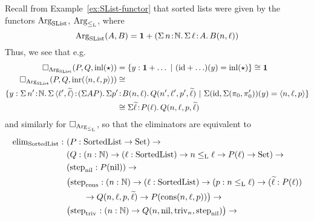 \documentclass[orivec,envcountsame, ,envcountsect]{llncs}
\begin{document}
 \begin{example}
   Recall from Example~\ref{ex:SList-functor} that sorted lists were given by the functors $\text{Arg}_{\text{SList}}$, $\text{Arg}_{\leq_{\text{L}}}$, where
\[ %
  \ArgSList(A, B) = \one + (\Sigma\, n\!:\!\Nat .\,\Sigma\,\ell\!:\!A.\, B(n,\ell))
\] %
   Thus, we see that e.g.\ 
   \begin{align*}
\BOX_{\ArgSList}(P, Q, \inl(\oneelt)) &=  
\{ y : \one + \ldots \ |\ (\id + \ldots)(y) = \inl(\oneelt) \} \cong \one \\
\BOX_{\ArgSList}(P, Q, \inr(\langle n, \ell, p\rangle)) &\cong \\
\{ y : \Sigma\, n'\!:\!\Nat .\,\Sigma\,\langle \ell', \stepindarg{\ell}\rangle\!:\!(\Sigma A P).\, \Sigma p'\!&:\!B(n,\ell).\,Q(n', \ell', p', \stepindarg{\ell})\ |\ \Sigma(\id, \Sigma(\pi_0, \pi'_0))(y) = \langle n, \ell, p\rangle\} \\
 & \cong \Sigma \stepindarg{\ell}\!:\!P(\ell).\,Q(n, \ell, p, \stepindarg{\ell})
   \end{align*}
   and similarly for $\Box_{\text{Arg}_{\leq_{\text{L}}}}$, so that the eliminators are equivalent to
   \begin{align*}
  \elim_{\SortedList} :\ & (P : \SortedList \to \Set) \to \\
                     & (Q : (n : \Nat) \to (\ell : \SortedList) \to n \lessList \ell \to P(\ell) \to \Set) \to \\
                     & (\stepind{\nilList} : P(\nilList)) \to \\
                     & \big(\stepind{\consListbare} : (n : \Nat) \to (\ell : \SortedList) \to (p : n \lessList \ell) \to (\stepindarg{\ell} : P(\ell)) \\
                     & \qquad \to Q(n, \ell, p, \stepindarg{\ell}) \to P(\consList{n}{\ell}{p})\big) \to \\
                     & \big(\stepind{\nilLess{}} : (n : \Nat) \to Q(n, \nilList, \nilLess{n}, \stepind{\nilList})\big) \to \\

\end{align*}
\end{example}
\end{document}
